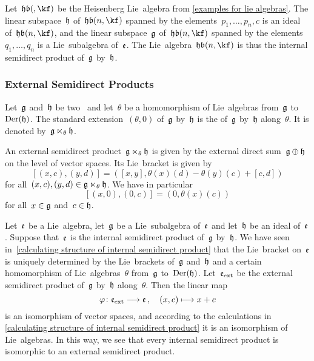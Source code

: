 

\begin{example}
	Let~$\heisenberglie(, \kf)$ be the Heisenberg Lie~algebra from \cref{examples for lie algebras}.
	The linear subspace~$\mathfrak{h}$ of~$\heisenberglie(n, \kf)$ spanned by the elements~$p_1, \dotsc, p_n, c$ is an ideal of~$\heisenberglie(n, \kf)$, and the linear subspace~$\mathfrak{g}$ of~$\heisenberglie(n, \kf)$ spanned by the elements~$q_1, \dotsc, q_n$ is a Lie~subalgebra of~$\mathfrak{e}$.
	The Lie~algebra~$\heisenberglie(n, \kf)$ is thus the internal semidirect product of~$\mathfrak{g}$ by~$\mathfrak{h}$.
\end{example}

\subsubsection{External Semidirect Products}

\begin{definition}
	Let~$\mathfrak{g}$ and~$\mathfrak{h}$ be two~\liealgebras{$\kf$} and let~$\theta$ be a homomorphism of Lie~algebras from~$\mathfrak{g}$ to~$\operatorname{Der}(\mathfrak{h})$.
	The standard extension~$(\theta, 0)$ of~$\mathfrak{g}$ by~$\mathfrak{h}$ is the  of~$\mathfrak{g}$ by~$\mathfrak{h}$ along~$\theta$.
	It is denoted by~$\mathfrak{g} \ltimes_\theta \mathfrak{h}$.
\end{definition}


\begin{remark}
	An external semidirect product~$\mathfrak{g} \ltimes_\theta \mathfrak{h}$ is given by the external direct sum~$\mathfrak{g} \oplus \mathfrak{h}$ on the level of vector spaces.
	Its Lie~bracket is given by
	\[
		[ (x,c), (y,d) ]
		=
		( [x,y], \theta(x)(d) - \theta(y)(c) + [c,d] )
	\]
	for all~$(x,c), (y,d) \in \mathfrak{g} \ltimes_\theta \mathfrak{h}$.
	We have in particular
	\[
		[(x,0), (0,c)]
		=
		( 0, \theta(x)(c) )
	\]
	for all~$x \in \mathfrak{g}$ and~$c \in \mathfrak{h}$.
\end{remark}


\begin{fluff}
	\label{internal semidirect product is also external}
	Let~$\mathfrak{e}$ be a Lie~algebra, let~$\mathfrak{g}$ be a Lie~subalgebra of~$\mathfrak{e}$ and let~$\mathfrak{h}$ be an ideal of~$\mathfrak{e}$.
	Suppose that~$\mathfrak{e}$ is the internal semidirect product of~$\mathfrak{g}$ by~$\mathfrak{h}$.
	We have seen in~\cref{calculating structure of internal semidirect product} that the Lie~bracket on~$\mathfrak{e}$ is uniquely determined by the Lie~brackets of~$\mathfrak{g}$ and~$\mathfrak{h}$ and a certain homomorphism of Lie~algebras~$\theta$ from~$\mathfrak{g}$ to~$\operatorname{Der}(\mathfrak{h})$.
	Let~$\mathfrak{e}_{\mathrm{ext}}$ be the external semidirect product of~$\mathfrak{g}$ by~$\mathfrak{h}$ along~$\theta$.
	Then the linear map
	\[
		\varphi
		\colon
		\elie_{\ext}
		\to
		\elie \,,
		\quad
		(x, c)
		\mapsto
		x + c
	\]
	is an isomorphism of vector spaces, and according to the calculations in \cref{calculating structure of internal semidirect product} it is an isomorphism of Lie~algebras.
	In this way, we see that every internal semidirect product is isomorphic to an external semidirect product.
\end{fluff}


